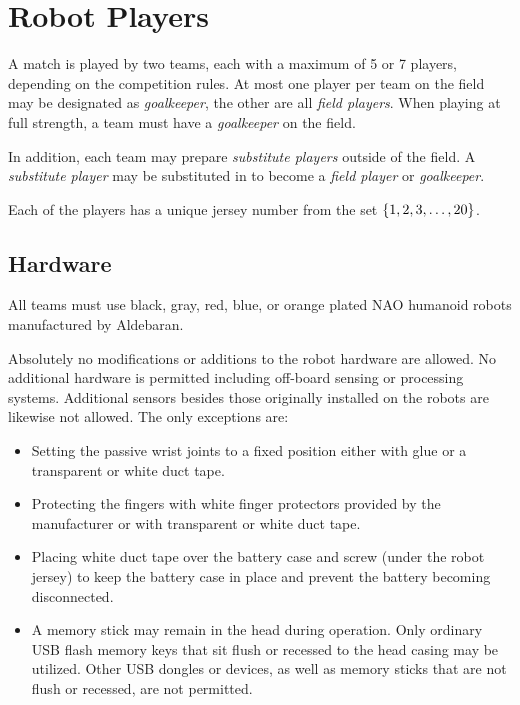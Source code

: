 \section{Robot Players}
\label{sec:robot_players}
A match is played by two teams, each with a maximum of 5 or 7 players, depending on the competition rules.
At most one player per team on the field may be designated as \emph{goalkeeper}, the other are all \emph{field players}.
When playing at full strength, a team must have a \emph{goalkeeper} on the field.

In addition, each team may prepare \emph{substitute players} outside of the field. A \emph{substitute player} may be substituted in to become a \emph{field player} or \emph{goalkeeper}.

Each of the players has a unique jersey number from the set $\{1, 2, 3, \ldots, 20\}$.

\subsection{Hardware}
\label{sec:hardware}
All teams must use black, gray, red, blue, or orange plated NAO humanoid robots manufactured by Aldebaran.

Absolutely no modifications or additions to the robot hardware are allowed. No additional hardware is permitted including off-board sensing or processing systems. Additional sensors besides those originally installed on the robots are likewise not allowed. The only exceptions are:

\begin{itemize}
    \item Setting the passive wrist joints to a fixed position either with glue or a transparent or white duct tape.
    \item Protecting the fingers with white finger protectors provided by the manufacturer or with transparent or white duct tape.
    \item Placing white duct tape over the battery case and screw (under the robot jersey) to keep the battery case in place and prevent the battery becoming disconnected.
    \item A memory stick may remain in the head during operation.  Only ordinary USB flash memory keys that sit flush or recessed to the head casing may be utilized. Other USB dongles or devices, as well as memory sticks that are not flush or recessed, are not permitted.
\end{itemize}

